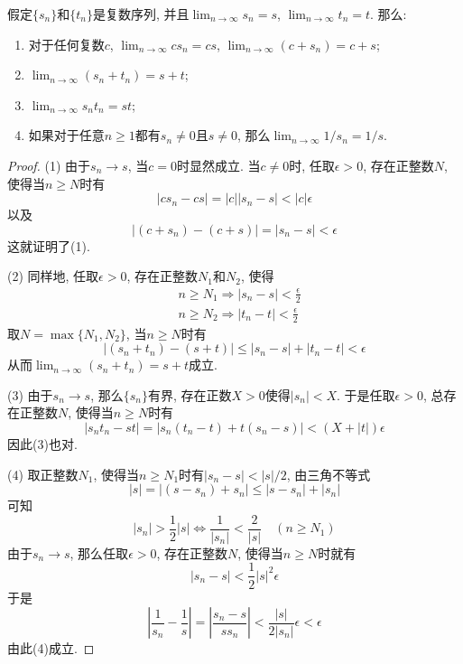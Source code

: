\documentclass[cn,12pt,math=mtpro2,citestyle=gb7714-2015,bibstyle=gb7714-2015,twocol]{elegantbook}
\newcommand{\limn }{\lim_{n\to\infty}}
\begin{document}
  \begin{theorem}\label{thm:th3.1}
    假定$\{s_n\}$和$\{t_n\}$是复数序列, 并且$\limn  s_n=s$, $\limn  t_n=t$. 那么:
    \begin{enumerate}[label=(\arabic*)]
    \item 对于任何复数$c$, $\limn  cs_n=cs$, $\limn (c+s_n)=c+s$;

    \item $\limn (s_n+t_n)=s+t$;

    \item $\limn  s_nt_n=st$;

    \item 如果对于任意$n\ge1$都有$s_n\neq 0$且$s\neq0$, 那么$\limn 1/s_n=1/s$.
    \end{enumerate}
  \end{theorem}
  \begin{proof}
    (1) 由于$s_n\rightarrow s$, 当$c=0$时显然成立. 当$c\neq 0$时, 任取$\epsilon>0$, 存在正整数$N$, 使得当$n\geq N$时有
    $$|cs_n-cs|=|c||s_n-s|<|c|\epsilon$$
    以及
    $$|(c+s_n)-(c+s)|=|s_n-s|<\epsilon$$
    这就证明了(1).

    (2) 同样地, 任取$\epsilon>0$, 存在正整数$N_1$和$N_2$, 使得
    \begin{align*}
    &n\geq N_1\Rightarrow |s_n-s|<\frac{\epsilon}{2} \\
    &n\geq N_2\Rightarrow |t_n-t|<\frac{\epsilon}{2}
    \end{align*}
    取$N=\max\{N_1,N_2\}$, 当$n\geq N$时有
    $$|(s_n+t_n)-(s+t)|\leq |s_n-s|+|t_n-t|<\epsilon$$
    从而$\displaystyle\limn (s_n+t_n)=s+t$成立.

    (3) 由于$s_n\rightarrow s$, 那么$\{s_n\}$有界, 存在正数$X>0$使得$|s_n|<X$. 于是任取$\epsilon>0$, 总存在正整数$N$, 使得当$n\geq N$时有
    $$|s_nt_n-st|=|s_n(t_n-t)+t(s_n-s)|<(X+|t|)\epsilon$$
    因此(3)也对.

    (4) 取正整数$N_1$, 使得当$n\geq N_1$时有$|s_n-s|<|s|/2$, 由三角不等式
    $$|s|=|(s-s_n)+s_n|\leq |s-s_n|+|s_n|$$
    可知
    $$|s_n|>\frac{1}{2}|s|\Leftrightarrow\frac{1}{|s_n|}<\frac{2}{|s|}\quad(n\geq N_1)$$
    由于$s_n\rightarrow s$, 那么任取$\epsilon>0$, 存在正整数$N$, 使得当$n\geq N$时就有
    $$|s_n-s|<\frac{1}{2}|s|^2\epsilon$$
    于是
    $$\left|\frac{1}{s_n}-\frac{1}{s}\right|=\left|\frac{s_n-s}{ss_n}\right|<\frac{|s|}{2|s_n|}\epsilon<\epsilon$$
    由此(4)成立.
  \end{proof}
\end{document}

